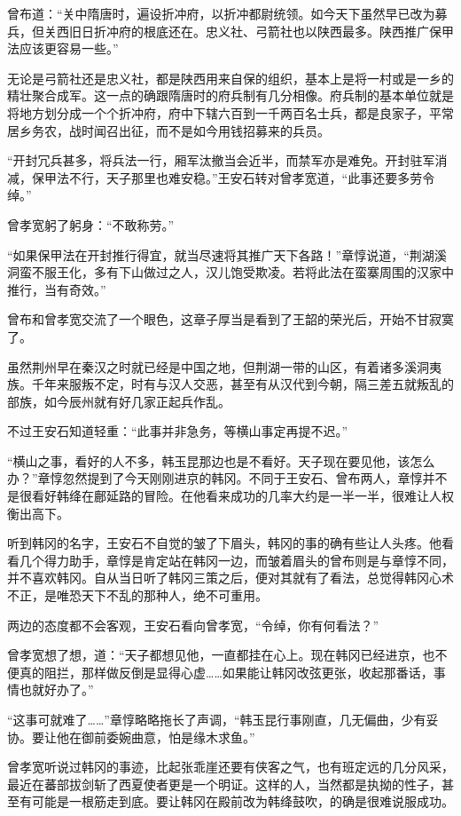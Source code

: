 曾布道：“关中隋唐时，遍设折冲府，以折冲都尉统领。如今天下虽然早已改为募兵，但关西旧日折冲府的根底还在。忠义社、弓箭社也以陕西最多。陕西推广保甲法应该更容易一些。”

无论是弓箭社还是忠义社，都是陕西用来自保的组织，基本上是将一村或是一乡的精壮聚合成军。这一点的确跟隋唐时的府兵制有几分相像。府兵制的基本单位就是将地方划分成一个个折冲府，府中下辖六百到一千两百名士兵，都是良家子，平常居乡务农，战时闻召出征，而不是如今用钱招募来的兵员。

“开封冗兵甚多，将兵法一行，厢军汰撤当会近半，而禁军亦是难免。开封驻军消减，保甲法不行，天子那里也难安稳。”王安石转对曾孝宽道，“此事还要多劳令绰。”

曾孝宽躬了躬身：“不敢称劳。”

“如果保甲法在开封推行得宜，就当尽速将其推广天下各路！”章惇说道，“荆湖溪洞蛮不服王化，多有下山做过之人，汉儿饱受欺凌。若将此法在蛮寨周围的汉家中推行，当有奇效。”

曾布和曾孝宽交流了一个眼色，这章子厚当是看到了王韶的荣光后，开始不甘寂寞了。

虽然荆州早在秦汉之时就已经是中国之地，但荆湖一带的山区，有着诸多溪洞夷族。千年来服叛不定，时有与汉人交恶，甚至有从汉代到今朝，隔三差五就叛乱的部族，如今辰州就有好几家正起兵作乱。

不过王安石知道轻重：“此事并非急务，等横山事定再提不迟。”

“横山之事，看好的人不多，韩玉昆那边也是不看好。天子现在要见他，该怎么办？”章惇忽然提到了今天刚刚进京的韩冈。不同于王安石、曾布两人，章惇并不是很看好韩绛在鄜延路的冒险。在他看来成功的几率大约是一半一半，很难让人权衡出高下。

听到韩冈的名字，王安石不自觉的皱了下眉头，韩冈的事的确有些让人头疼。他看看几个得力助手，章惇是肯定站在韩冈一边，而皱着眉头的曾布则是与章惇不同，并不喜欢韩冈。自从当日听了韩冈三策之后，便对其就有了看法，总觉得韩冈心术不正，是唯恐天下不乱的那种人，绝不可重用。

两边的态度都不会客观，王安石看向曾孝宽，“令绰，你有何看法？”

曾孝宽想了想，道：“天子都想见他，一直都挂在心上。现在韩冈已经进京，也不便真的阻拦，那样做反倒是显得心虚……如果能让韩冈改弦更张，收起那番话，事情也就好办了。”

“这事可就难了……”章惇略略拖长了声调，“韩玉昆行事刚直，几无偏曲，少有妥协。要让他在御前委婉曲意，怕是缘木求鱼。”

曾孝宽听说过韩冈的事迹，比起张乖崖还要有侠客之气，也有班定远的几分风采，最近在蕃部拔剑斩了西夏使者更是一个明证。这样的人，当然都是执拗的性子，甚至有可能是一根筋走到底。要让韩冈在殿前改为韩绛鼓吹，的确是很难说服成功。

